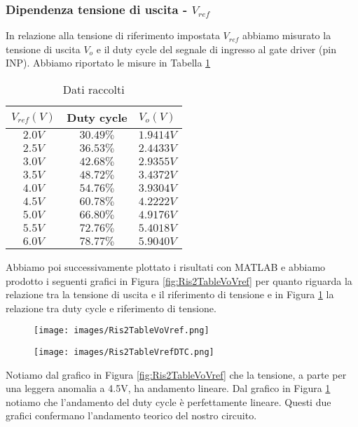 \subsubsection{Dipendenza tensione di uscita - $V_{ref}$}
In relazione alla tensione di riferimento impostata $V_{ref}$ abbiamo misurato la tensione di uscita $V_o$ e il duty cycle del segnale di ingresso al gate driver (pin INP). Abbiamo riportato le misure in Tabella \ref{tab:Tab2.3.1}
\begin{table}[H]
    \centering
    \begin{tabular}{|c|c|c|}
        \hline
        $V_{ref}(V)$&Duty cycle&$V_o(V)$\\\hline\hline
        $2.0V$&$30.49\%$&$1.9414V$\\\hline
        $2.5V$&$36.53\%$&$2.4433V$\\\hline
        $3.0V$&$42.68\%$&$2.9355V$\\\hline
        $3.5V$&$48.72\%$&$3.4372V$\\\hline
        $4.0V$&$54.76\%$&$3.9304V$\\\hline
        $4.5V$&$60.78\%$&$4.2222V$\\\hline
        $5.0V$&$66.80\%$&$4.9176V$\\\hline
        $5.5V$&$72.76\%$&$5.4018V$\\\hline
        $6.0V$&$78.77\%$&$5.9040V$\\\hline
    \end{tabular}
    \caption{Dati raccolti}
    \label{tab:Tab2.3.1}
\end{table}
Abbiamo poi successivamente plottato i risultati con MATLAB e abbiamo prodotto i seguenti grafici in Figura \ref{fig:Ris2TableVoVref} per quanto riguarda la relazione tra la tensione di uscita e il riferimento di tensione e in Figura \ref{fig:Ris2TableVrefDTC} la relazione tra duty cycle e riferimento di tensione.
\begin{figure}[H]
    \centering
    \begin{minipage}{.5\linewidth}
        \centering
        \texttt{[image: images/Ris2TableVoVref.png]}
        \caption{}
        \label{fig:Ris2TableVoVref}
    \end{minipage}%
    \begin{minipage}{.5\linewidth}
        \centering
        \texttt{[image: images/Ris2TableVrefDTC.png]}
        \caption{}
        \label{fig:Ris2TableVrefDTC}
    \end{minipage}
\end{figure}
Notiamo dal grafico in Figura \ref{fig:Ris2TableVoVref} che la tensione, a parte per una leggera anomalia a 4.5V, ha andamento lineare. Dal grafico in Figura \ref{fig:Ris2TableVrefDTC} notiamo che l'andamento del duty cycle è perfettamente lineare. Questi due grafici confermano l'andamento teorico del nostro circuito.